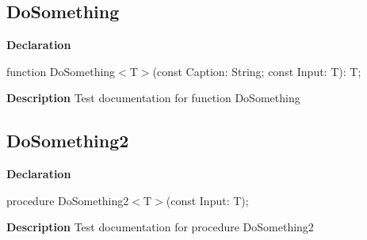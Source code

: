 \documentclass{report}
\begin{document}
\subsection*{DoSomething}
\begin{list}{}{
\setlength{\itemindent}{0cm}
\setlength{\listparindent}{0cm}
\setlength{\leftmargin}{\evensidemargin}
\addtolength{\leftmargin}{\tmplength}
\settowidth{\labelsep}{X}
\addtolength{\leftmargin}{\labelsep}
\setlength{\labelwidth}{\tmplength}
}
\begin{flushleft}
\item[\textbf{Declaration}\hfill]
\begin{ttfamily}
function DoSomething{$<$}T{$>$}(const Caption: String; const Input: T): T;\end{ttfamily}


\end{flushleft}
\par
\item[\textbf{Description}]
Test documentation for function DoSomething

\end{list}
\subsection*{DoSomething2}
\begin{list}{}{
\setlength{\itemindent}{0cm}
\setlength{\listparindent}{0cm}
\setlength{\leftmargin}{\evensidemargin}
\addtolength{\leftmargin}{\tmplength}
\settowidth{\labelsep}{X}
\addtolength{\leftmargin}{\labelsep}
\setlength{\labelwidth}{\tmplength}
}
\begin{flushleft}
\item[\textbf{Declaration}\hfill]
\begin{ttfamily}
procedure DoSomething2{$<$}T{$>$}(const Input: T);\end{ttfamily}


\end{flushleft}
\par
\item[\textbf{Description}]
Test documentation for procedure DoSomething2

\end{list}
\end{document}
